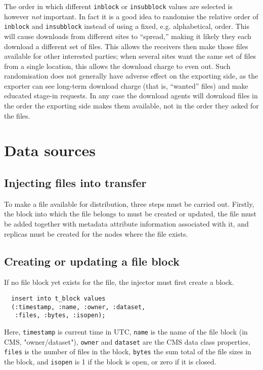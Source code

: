 \documentclass{cmspaper}
\begin{document}
The order in which different \texttt{inblock} or \texttt{insubblock} values are selected is however {\em not} important.  In fact it is a good idea to randomise the relative order of \texttt{inblock} and \texttt{insubblock} instead of using a fixed, e.g. alphabetical, order.  This will cause downloads from different sites to ``spread,'' making it likely they each download a different set of files.  This allows the receivers then make those files available for other interested parties; when several sites want the same set of files from a single location, this allows the download charge to even out.  Such randomisation does not generally have adverse effect on the exporting side, as the exporter can see long-term download charge (that is, ``wanted'' files) and make educated stage-in requests.  In any case the download agents will download files in the order the exporting side makes them available, not in the order they asked for the files.

\section{Data sources}

\subsection{Injecting files into transfer}

To make a file available for distribution, three steps must be carried out.  Firstly, the block into which the file belongs to must be created or updated, the file must be added together with metadata attribute information associated with it, and replicas must be created for the nodes where the file exists.

\subsection{Creating or updating a file block}

If no file block yet exists for the file, the injector must first create a block.

{\small\begin{verbatim}
  insert into t_block values
  (:timestamp, :name, :owner, :dataset,
   :files, :bytes, :isopen);
\end{verbatim}}

Here, \texttt{timestamp} is current time in UTC, \texttt{name} is the name of the file block (in CMS, "owner/dataset"), \texttt{owner} and \texttt{dataset} are the CMS data class properties, \texttt{files} is the number of files in the block, \texttt{bytes} the sum total of the file sizes in the block, and \texttt{isopen} is 1 if the block is open, or zero if it is closed.
\end{document}
